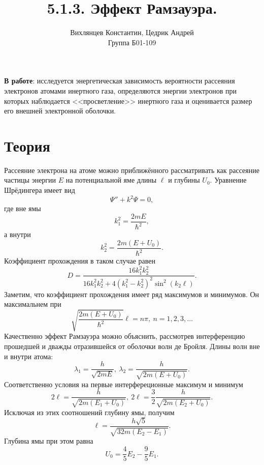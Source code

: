 \documentclass[a4paper,12pt]{article}
\author{Вихлянцев Константин, Цедрик Андрей\\
Группа Б01-109}
\title{5.1.3. Эффект Рамзауэра.}
\date{}
\begin{document}
\maketitle
\textbf{В работе}: исследуется энергетическая зависимость вероятности рассеяния электронов атомами инертного газа, определяются энергии электронов при которых наблюдается <<просветление>> инертного газа и оценивается размер его внешней электронной оболочки.

\section*{Теория}
Рассеяние электрона на атоме можно приближённого рассматривать как рассеяние частицы энергии $E$ на потенциальной яме длины $\ell$ и глубины $U_0$. Уравнение Шрёдингера имеет вид
\[\Psi'' + k^2 \Psi = 0,\]
где вне ямы 
\[k_1^2 = \dfrac{2mE}{\hbar^2},\]
а внутри 
\[k_2^2 = \dfrac{2m(E+U_0)}{\hbar^2}.\]
Коэффициент прохождения в таком случае равен
\[D = \dfrac{16 k_1^2 k_2^2}{16k_1^2 k_2^2 + 4(k_1^2 - k_2^2)^2\sin^2(k_2\ell)}.\]
Заметим, что коэффициент прохождения имеет ряд максимумов и минимумов. Он максимальнем при
\begin{equation}\label{0}
\sqrt{\dfrac{2m(E+U_0)}{\hbar^2}}\ell = n\pi,~n=1,2,3,\dots
\end{equation}
Качественно эффект Рамзауэра можно объяснить, рассмотрев интерференцию прошедшей и дважды отразившейся от оболочки волн де Бройля. Длины волн вне и внутри атома:
\[\lambda_1 = \dfrac{h}{\sqrt{2mE}},~\lambda_2 = \dfrac{h}{\sqrt{2m(E+U_0)}}.\]
Соответственно условия на первые интерфереционные максимум и минимум 
\begin{equation}\label{1}
2\ell = \dfrac{h}{\sqrt{2m(E_1 + U_0)}},~2\ell = \dfrac{3}{2}\dfrac{h}{\sqrt{2m(E_2 + U_0)}}.
\end{equation}
Исключая из этих соотношений глубину ямы, получим
\begin{equation}\label{2}
\ell = \dfrac{h\sqrt{5}}{\sqrt{32m(E_2 - E_1)}}.
\end{equation}
Глубина ямы при этом равна
\begin{equation}\label{4}
U_0 = \dfrac{4}{5}E_2 - \dfrac{9}{5}E_1.
\end{equation}
\end{document}

